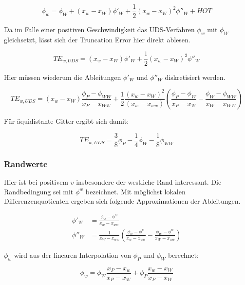 \begin{equation*}
  \phi_w = \phi_W +(x_w-x_W) \phi'_W + \frac{1}{2} (x_w-x_W)^2 \phi''_W+HOT
\end{equation*}

Da im Falle einer positiven Geschwindigkeit das UDS-Verfahren $\phi_w$ mit $\phi_W$
gleichsetzt, lässt sich der Truncation Error hier direkt ablesen.

\begin{equation*}
  TE_{w, UDS} = (x_w-x_W) \phi'_W + \frac{1}{2} (x_w-x_W)^2 \phi''_W
\end{equation*}

Hier müssen wiederum die Ableitungen $\phi'_W$ und $\phi''_W$ diskretisiert werden.

\begin{equation}
  TE_{w, UDS} = (x_w-x_W) \frac{\phi_P-\phi_{WW}}{x_P-x_{WW}}+
  \frac{1}{2} \frac{(x_w-x_W)^2}{(x_w-x_{ww})} \left({\frac{\phi_P-\phi_W}{x_P-x_W}
  - \frac{\phi_W-\phi_{WW}}{x_W-x_{WW}} }\right)
\end{equation}

Für äquidistante Gitter ergibt sich damit:

\begin{equation}
  TE_{w, UDS} = \frac{3}{8} \phi_P-\frac{1}{4} \phi_W - \frac{1}{8} \phi_{WW}
\end{equation}


\subsubsection{Randwerte}

Hier ist bei positivem $v$ insbesondere der westliche Rand interessant. Die
Randbedingung sei mit $\phi^w$ bezeichnet. Mit möglichst lokalen Differenzenquotienten
ergeben sich folgende Approximationen der Ableitungen.

\begin{align*}
  \phi'_W &= \frac{\phi_w-\phi^w}{x_w-x_{ww}}\\
  \phi''_W &= \frac{1}{x_W-x_{ww}} \left({\frac{\phi_w-\phi^w}{x_w-x_{ww}}
- \frac{\phi_W-\phi^w}{x_W-x_{ww}} }\right)
\end{align*}

$\phi_w$ wird aus der linearen Interpolation von $\phi_P$ und $\phi_W$ berechnet:

\begin{equation*}
  \phi_w = \phi_W \frac{x_P-x_w}{x_P-x_W} + \phi_P \frac{x_w-x_W}{x_P-x_W}
\end{equation*}

